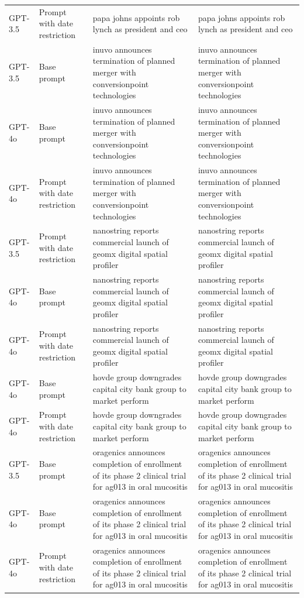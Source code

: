 \begin{longtable}{>{\raggedright\arraybackslash}p{1.4cm}>{\raggedright\arraybackslash}p{1.4cm}>{\raggedright\arraybackslash}p{5.5cm}>{\raggedright\arraybackslash}p{5.5cm}}
GPT-3.5 & Prompt with date restriction & papa johns appoints rob lynch as president and ceo & papa johns appoints rob lynch as president and ceo\\
GPT-3.5 & Base prompt & inuvo announces termination of planned merger with conversionpoint technologies & inuvo announces termination of planned merger with conversionpoint technologies\\
GPT-4o & Base prompt & inuvo announces termination of planned merger with conversionpoint technologies & inuvo announces termination of planned merger with conversionpoint technologies\\
GPT-4o & Prompt with date restriction & inuvo announces termination of planned merger with conversionpoint technologies & inuvo announces termination of planned merger with conversionpoint technologies\\
GPT-3.5 & Prompt with date restriction & nanostring reports commercial launch of geomx digital spatial profiler & nanostring reports commercial launch of geomx digital spatial profiler\\
GPT-4o & Base prompt & nanostring reports commercial launch of geomx digital spatial profiler & nanostring reports commercial launch of geomx digital spatial profiler\\
GPT-4o & Prompt with date restriction & nanostring reports commercial launch of geomx digital spatial profiler & nanostring reports commercial launch of geomx digital spatial profiler\\
GPT-4o & Base prompt & hovde group downgrades capital city bank group to market perform & hovde group downgrades capital city bank group to market perform\\
GPT-4o & Prompt with date restriction & hovde group downgrades capital city bank group to market perform & hovde group downgrades capital city bank group to market perform\\
GPT-3.5 & Base prompt & oragenics announces completion of enrollment of its phase 2 clinical trial for ag013 in oral mucositis & oragenics announces completion of enrollment of its phase 2 clinical trial for ag013 in oral mucositis\\
GPT-4o & Base prompt & oragenics announces completion of enrollment of its phase 2 clinical trial for ag013 in oral mucositis & oragenics announces completion of enrollment of its phase 2 clinical trial for ag013 in oral mucositis\\
GPT-4o & Prompt with date restriction & oragenics announces completion of enrollment of its phase 2 clinical trial for ag013 in oral mucositis & oragenics announces completion of enrollment of its phase 2 clinical trial for ag013 in oral mucositis\\

\end{longtable}
